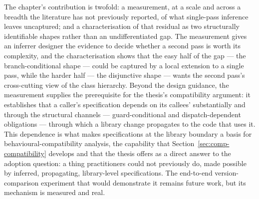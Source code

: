 The chapter's contribution is twofold: a measurement, at a scale and across a
breadth the literature has not previously reported, of what single-pass inference
leaves uncaptured; and a characterisation of that residual as two structurally
identifiable shapes rather than an undifferentiated gap. The measurement gives an
inferrer designer the evidence to decide whether a second pass is worth its
complexity, and the characterisation shows that the easy half of the gap --- the
branch-conditional shape --- could be captured by a local extension to a single
pass, while the harder half --- the disjunctive shape --- wants the second pass's
cross-cutting view of the class hierarchy. Beyond the design guidance, the
measurement supplies the prerequisite for the thesis's compatibility argument: it
establishes that a caller's specification depends on its callees' substantially and
through the structural channels --- guard-conditional and dispatch-dependent
obligations --- through which a library change propagates to the code that uses it.
This dependence is what makes specifications at the library boundary a basis for
behavioural-compatibility analysis, the capability that
Section~\ref{sec:comp-compatibility} develops and that the thesis offers as a
direct answer to the adoption question: a thing practitioners could not previously
do, made possible by inferred, propagating, library-level specifications. The
end-to-end version-comparison experiment that would demonstrate it remains future
work, but its mechanism is measured and real.
